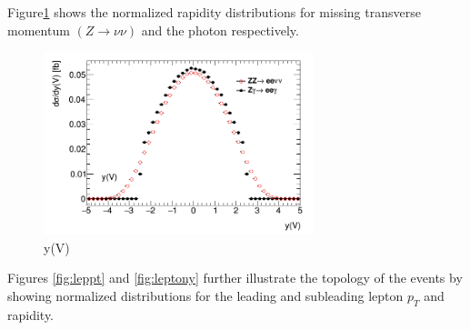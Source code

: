 \documentclass[11pt,a4paper,openright,twoside]{report}
\begin{document}
Figure\ref{fig:yy} shows the normalized rapidity distributions for missing transverse momentum $(Z\to\nu\nu)$ and the photon respectively.
\begin{figure}[H]
\centering
	\includegraphics[width=0.7\textwidth]{yy.png}
	\caption{y(V)}
	\label{fig:yy}
\end{figure}
Figures \ref{fig:leppt} and \ref{fig:leptony} further illustrate the topology of the events by showing normalized distributions for the leading and subleading lepton $p_T$ and rapidity.
\end{document}
